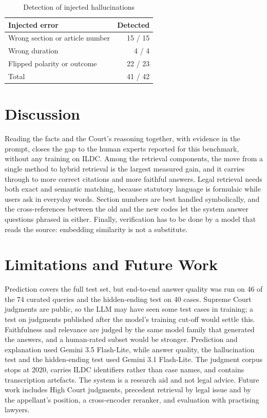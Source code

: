 \documentclass[conference]{IEEEtran}
\begin{document}
\begin{table}[t]
\caption{Detection of injected hallucinations}
\label{tab:hal}
\centering
\begin{tabular}{@{}lr@{}}
\toprule
Injected error & Detected \\
\midrule
Wrong section or article number & 15 / 15 \\
Wrong duration & 4 / 4 \\
Flipped polarity or outcome & 22 / 23 \\
\midrule
Total & 41 / 42 \\
\bottomrule
\end{tabular}
\end{table}

\section{Discussion}
Reading the facts and the Court's reasoning together, with evidence in the prompt, closes the gap to the human experts reported for this benchmark, without any training on ILDC. Among the retrieval components, the move from a single method to hybrid retrieval is the largest measured gain, and it carries through to more correct citations and more faithful answers. Legal retrieval needs both exact and semantic matching, because statutory language is formulaic while users ask in everyday words. Section numbers are best handled symbolically, and the cross-references between the old and the new codes let the system answer questions phrased in either. Finally, verification has to be done by a model that reads the source: embedding similarity is not a substitute.

\section{Limitations and Future Work}
Prediction covers the full test set, but end-to-end answer quality was run on 46 of the 74 curated queries and the hidden-ending test on 40 cases. Supreme Court judgments are public, so the LLM may have seen some test cases in training; a test on judgments published after the model's training cut-off would settle this. Faithfulness and relevance are judged by the same model family that generated the answers, and a human-rated subset would be stronger. Prediction and explanation used Gemini 3.5 Flash-Lite, while answer quality, the hallucination test and the hidden-ending test used Gemini 3.1 Flash-Lite. The judgment corpus stops at 2020, carries ILDC identifiers rather than case names, and contains transcription artefacts. The system is a research aid and not legal advice. Future work includes High Court judgments, precedent retrieval by legal issue and by the appellant's position, a cross-encoder reranker, and evaluation with practising lawyers.
\end{document}
